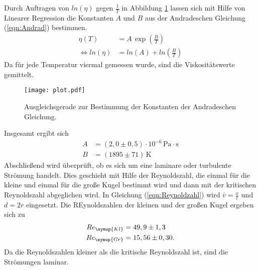 Durch Auftragen von $ln(\eta)$ gegen $\frac{1}{T}$ in Abbildung \ref{fig:plot} lassen sich mit Hilfe von Linearer Regression die Konstanten $A$ und $B$
aus der Andradeschen Gleichung (\ref{eqn:Andrad}) bestimmen.
\begin{align*}
  \eta(T) &= A \, \exp{\left(\frac{B}{T}\right)} \\
  \iff ln(\eta) &= ln(A) + ln(\frac{B}{T})
\end{align*}
Da für jede Temperatur viermal gemessen wurde, sind die Viskositätswerte gemittelt.

\begin{figure}
  \centering
  \texttt{[image: plot.pdf]}
  \caption{Ausgleichsgerade zur Bestimmung der Konstanten der Andradeschen Gleichung.}
  \label{fig:plot}
\end{figure}

Insgesamt ergibt sich
\begin{align*}
  A &= (2,0 \pm 0,5)\cdot 10^{-6}\,\unit{\pascal}\cdot \unit{\second}\\
  B &= (1895 \pm 71)\,\unit{\kelvin}
\end{align*}
Abschließend wird überprüft, ob es sich um eine laminare oder turbulente Strömung handelt. Dies geschieht mit Hilfe der Reynoldszahl, die einmal für die kleine und
einmal für die große Kugel bestimmt wird und dann mit der kritischen Reynoldszahl abgeglichen wird. In Gleichung (\ref{eqn:Reynoldzahl}) wird $\bar{v} = \frac{x}{t}$
und $d = 2r$ eingesetzt. Die REynoldszahlen der kleinen und der großen Kugel ergeben sich zu
\begin{align*}
  Re_{\symup{Kl}} &= 49,9 \pm 1,3\\
  Re_{\symup{Gr}} &= 15,56 \pm 0,30.
\end{align*}
Da die Reynoldszahlen kleiner als die kritische Reynoldszahl ist, sind die Strömungen laminar.